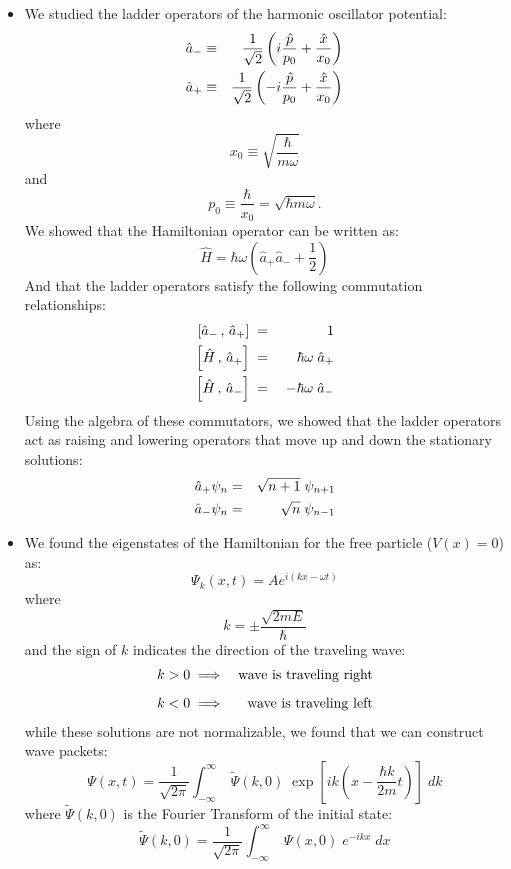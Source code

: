 \documentclass[12pt]{article}
\begin{document}
\begin{itemize}
\item We studied the ladder operators of the harmonic oscillator potential:
\begin{eqnarray}
\hat{a}_- &\equiv& \frac{1}{\sqrt{2}}\left(i \frac{\hat{p}}{p_0} + \frac{\hat{x}}{x_0}\right) \notag \\
\hat{a}_+ &\equiv& \frac{1}{\sqrt{2}}\left(-i \frac{\hat{p}}{p_0} + \frac{\hat{x}}{x_0} \right) \notag \\
\end{eqnarray}
where
$$x_0 \equiv \sqrt{\frac{\hbar}{m \omega}}$$
and
$$p_0 \equiv \frac{\hbar}{x_0} = \sqrt{\hbar m \omega}.$$
We showed that the Hamiltonian operator can be written as:
$$\hat{H} =  \hbar\omega \left( \hat{a}_+ \hat{a}_- + \frac{1}{2} \right)$$
And that the ladder operators satisfy the following commutation relationships:
\begin{eqnarray}
\left[\hat{a}_-\,,\,\hat{a}_+\right] \; &=& \;  1 \notag \\  
\left[\hat{H}\,,\,\hat{a}_+\right]   \; &=& \;  \hbar \omega \; \hat{a}_+ \notag \\ 
\left[\hat{H}\,,\,\hat{a}_-\right]   \; &=& \; -\hbar \omega \; \hat{a}_- \notag \\
\end{eqnarray}
Using the algebra of these commutators, we showed that the ladder operators act as raising and lowering operators that move up and down the stationary solutions:
\begin{eqnarray}
\hat{a}_+ \psi_n &=& \sqrt{n+1} \; \psi_{n+1} \notag \\
\hat{a}_- \psi_n &=& \sqrt{n} \; \psi_{n-1} \notag \\
\end{eqnarray}

\item We found the eigenstates of the Hamiltonian for the free particle ($V(x)=0$) as:
\begin{equation}
\Psi_k(x,t) = A e^{i (k x-\omega t)}
\end{equation}
where
\begin{equation}
k = \pm\frac{\sqrt{2mE}}{\hbar}
\end{equation}
and the sign of $k$ indicates the direction of the traveling wave:
\begin{eqnarray*}
k > 0 &\implies& {\rm wave~is~traveling~right} \\[5pt]
k < 0 &\implies& {\rm wave~is~traveling~left} \\
\end{eqnarray*}
while these solutions are not normalizable, we found that we can construct wave packets:
\begin{equation}
\Psi(x,t) = \frac{1}{\sqrt{2\pi}} \int_{-\infty}^{\infty} \; \widetilde{\Psi}(k,0) \; 
\exp\left[ik\left(x-\frac{\hbar k}{2m}t\right)\right]\; dk 
\end{equation}
where $\widetilde{\Psi}(k,0)$ is the Fourier Transform of the initial state:
\begin{equation}
\widetilde{\Psi}(k,0) = \frac{1}{\sqrt{2\pi}} \int_{-\infty}^{\infty} \; \Psi(x,0) \; e^{-ikx} \; dx 
\end{equation}
\end{itemize}
\end{document}
